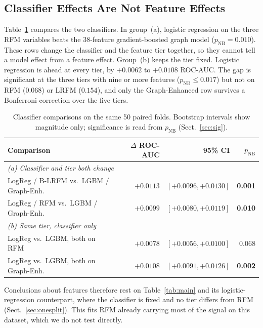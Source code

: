 \documentclass[runningheads]{llncs}
\begin{document}
\subsection{Classifier Effects Are Not Feature Effects}
\label{sec:cross}

Table~\ref{tab:cross} compares the two classifiers. In group~(a), logistic
regression on the three RFM variables beats the 38-feature gradient-boosted graph
model ($p_{\mathrm{NB}} = 0.010$). These rows change the classifier and the
feature tier together, so they cannot tell a model effect from a feature effect.
Group~(b) keeps the tier fixed. Logistic regression is ahead at every tier, by
$+0.0062$ to $+0.0108$ ROC-AUC. The gap is significant at the three tiers with
nine or more features ($p_{\mathrm{NB}} \le 0.017$) but not on RFM ($0.068$) or
LRFM ($0.154$), and only the Graph-Enhanced row survives a Bonferroni correction
over the five tiers.

\begin{table}[t]
\centering
\caption{Classifier comparisons on the same 50 paired folds. Bootstrap intervals
show magnitude only; significance is read from $p_{\mathrm{NB}}$
(Sect.~\ref{sec:sig}).}
\label{tab:cross}
\begin{tabular}{lrrr}
\toprule
Comparison & $\Delta$ ROC-AUC & 95\% CI & $p_{\mathrm{NB}}$ \\
\midrule
\multicolumn{4}{l}{\emph{(a) Classifier and tier both change}} \\
LogReg / B-LRFM vs.\ LGBM / Graph-Enh. & $+0.0113$ & $[+0.0096, +0.0130]$ & \textbf{0.001} \\
LogReg / RFM vs.\ LGBM / Graph-Enh. & $+0.0099$ & $[+0.0080, +0.0119]$ & \textbf{0.010} \\
\multicolumn{4}{l}{\emph{(b) Same tier, classifier only}} \\
LogReg vs.\ LGBM, both on RFM & $+0.0078$ & $[+0.0056, +0.0100]$ & 0.068 \\
LogReg vs.\ LGBM, both on Graph-Enh. & $+0.0108$ & $[+0.0091, +0.0126]$ & \textbf{0.002} \\
\bottomrule
\end{tabular}
\end{table}

Conclusions about features therefore rest on Table~\ref{tab:main} and its
logistic-regression counterpart, where the classifier is fixed and no tier
differs from RFM (Sect.~\ref{sec:onesplit}). This fits RFM already carrying most
of the signal on this dataset, which we do not test directly.
\end{document}
